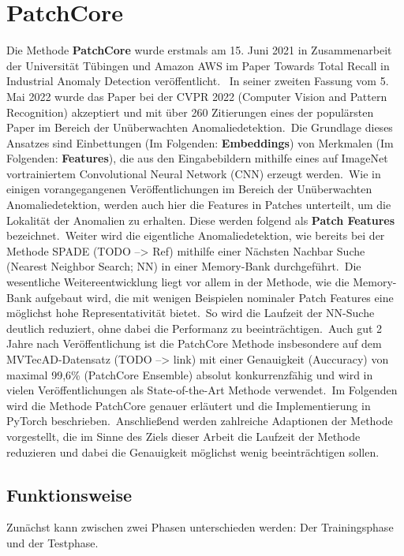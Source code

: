 
\chapter{PatchCore}
Die Methode \textbf{PatchCore} wurde erstmals am 15. Juni 2021 in Zusammenarbeit der Universität Tübingen und Amazon AWS im Paper \glqq Towards Total Recall in Industrial Anomaly Detection\grqq{} veröffentlicht. \ 
In seiner zweiten Fassung vom 5. Mai 2022 wurde das Paper bei der CVPR 2022 (Computer Vision and Pattern Recognition) akzeptiert und mit über 260 Zitierungen eines der populärsten Paper im Bereich der Unüberwachten Anomaliedetektion.\
Die Grundlage dieses Ansatzes sind \glqq Einbettungen\grqq{} (Im Folgenden: \textbf{Embeddings}) von Merkmalen (Im Folgenden: \textbf{Features}), die aus den Eingabebildern mithilfe eines auf \glqq ImageNet\grqq{} vortrainiertem \glqq Convolutional Neural Network (CNN)\grqq{} erzeugt werden.\
Wie in einigen vorangegangenen Veröffentlichungen im Bereich der Unüberwachten Anomaliedetektion, werden auch hier die Features in \glqq Patches\grqq{} unterteilt, um die Lokalität der Anomalien zu erhalten. Diese werden folgend als \textbf{\glqq Patch Features\grqq{}} bezeichnet.\
Weiter wird die eigentliche Anomaliedetektion, wie bereits bei der Methode \glqq SPADE\grqq{} (TODO --> Ref) mithilfe einer \glqq Nächsten Nachbar Suche (Nearest Neighbor Search; NN)\grqq{} in einer \glqq Memory-Bank \grqq{} durchgeführt.\
Die wesentliche Weitereentwicklung liegt vor allem in der Methode, wie die \glqq Memory-Bank\grqq{} aufgebaut wird, die mit wenigen Beispielen nominaler \glqq Patch Features\grqq{} eine möglichst hohe Representativität bietet.\
So wird die Laufzeit der NN-Suche deutlich reduziert, ohne dabei die Performanz zu beeinträchtigen.\
Auch gut 2 Jahre nach Veröffentlichung ist die PatchCore Methode insbesondere auf dem MVTecAD-Datensatz (TODO --> link) mit einer Genauigkeit (Auccuracy) von maximal 99,6\% (\glqq PatchCore Ensemble\grqq{}) absolut konkurrenzfähig und wird in vielen Veröffentlichungen als \glqq State-of-the-Art\grqq{} Methode verwendet.\
Im Folgenden wird die Methode PatchCore genauer erläutert und die Implementierung in PyTorch beschrieben.\
Anschließend werden zahlreiche Adaptionen der Methode vorgestellt, die im Sinne des Ziels dieser Arbeit die Laufzeit der Methode reduzieren und dabei die Genauigkeit möglichst wenig beeinträchtigen sollen.\
\section{Funktionsweise}
\label{sec:Funktionsweise}Zunächst kann zwischen zwei Phasen unterschieden werden: Der Trainingsphase und der Testphase.\
